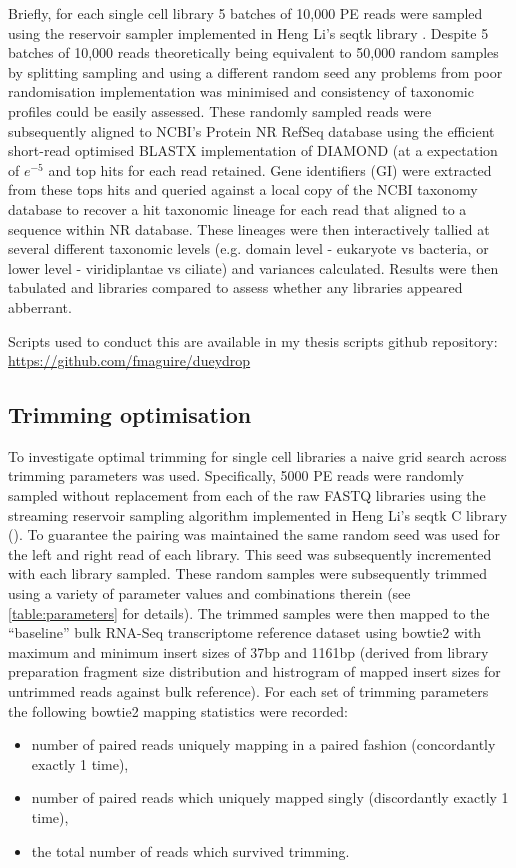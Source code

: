 Briefly, for each single cell library 5 batches of 10,000 PE reads were sampled 
using the reservoir sampler \citep{Vitter1985} implemented in Heng Li's seqtk library \citep{SeqtkGitHub}.
Despite 5 batches of 10,000 reads theoretically being equivalent to 50,000 random samples by splitting
sampling and using a different random seed any problems from poor randomisation implementation 
was minimised and consistency of taxonomic profiles could be easily assessed.
These randomly sampled reads were subsequently aligned to NCBI's Protein NR RefSeq database \citep{Pruitt2007}
using the efficient short-read optimised BLASTX implementation of DIAMOND \citep{Buchfink2015} (at a expectation
    of \(e^{-5}\) and top hits for each read retained.  Gene identifiers (GI) were extracted from these tops hits and queried against a
local copy of the NCBI taxonomy database \citep{Federhen2012} to recover a hit taxonomic lineage for each
read that aligned to a sequence within NR database. These lineages were then interactively tallied 
at several different taxonomic levels (e.g. domain level - eukaryote vs bacteria, or lower level - viridiplantae vs ciliate) and variances
calculated.  Results were then tabulated and libraries compared to assess whether any libraries appeared
abberrant.

Scripts used to conduct this are available in my thesis scripts github repository:
\url{https://github.com/fmaguire/dueydrop}

\subsection{Trimming optimisation}
To investigate optimal trimming for single cell libraries a naive grid search across trimming parameters was used.
Specifically, 5000 PE reads were randomly sampled without replacement from each of the raw FASTQ libraries 
using the streaming reservoir sampling \citep{Vitter1985} algorithm implemented in Heng Li's 
seqtk C library (\citep{SeqtkGitHub}).
To guarantee the pairing was maintained the same random seed was used for the left and right read
of each library. This seed was subsequently incremented with each library sampled.
These random samples were subsequently trimmed using a variety of parameter values and combinations therein 
(see \ref{table:parameters} for details).
The trimmed samples were then mapped to the ``baseline'' bulk RNA-Seq transcriptome reference dataset using bowtie2
\citep{Langmead2012} with maximum and minimum insert sizes of 37bp and 1161bp (derived from library preparation
fragment size distribution and histrogram of mapped insert sizes for untrimmed reads against bulk reference).
For each set of trimming parameters the following bowtie2 mapping statistics were recorded: 
\begin{itemize}
    \item number of paired reads uniquely mapping in a paired 
fashion (concordantly exactly 1 time), 
    \item number of paired reads which uniquely mapped 
singly (discordantly exactly 1 time), 
    \item the total number of reads which survived trimming.
\end{itemize}

